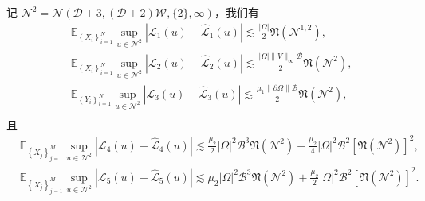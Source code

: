 \begin{lemma}\label{lemma:staerr:Rad234}
记 $\mathcal{N}^{2}=\mathcal{N}(\mathcal{D}+3,(\mathcal{D}+2)\mathcal{W},\{2\},\infty)$，我们有
\begin{equation*}
\begin{aligned}
&\mathbb{E}_{\left\{X_{i}\right\}_{i=1}^{N}} \sup _{u \in \mathcal{N}^{2}}\left|\mathcal{L}_{1}(u)-\widehat{\mathcal{L}}_{1}(u)\right| \lesssim \frac{|\Omega|}{2}\mathfrak{N}\left(\mathcal{N}^{1,2}\right),\\
&\mathbb{E}_{\left\{X_{i}\right\}_{i=1}^{N}} \sup _{u \in \mathcal{N}^{2}}\left|\mathcal{L}_{2}(u)-\widehat{\mathcal{L}}_{2}(u)\right| \lesssim \frac{|\Omega|\|V\|_{\infty}\mathcal{B}}{2}\mathfrak{N}\left(\mathcal{N}^{2}\right),\\
&\mathbb{E}_{\left\{Y_{i}\right\}_{i=1}^{N}} \sup _{u \in \mathcal{N}^{2}}\left|\mathcal{L}_{3}(u)-\widehat{\mathcal{L}}_{3}(u)\right| \lesssim \frac{\mu_{1}\|\partial \Omega\|\mathcal{B}}{2} \mathfrak{N}\left(\mathcal{N}^{2}\right),\\
\end{aligned}
\end{equation*}
且
\begin{equation*}
\begin{aligned}
&\mathbb{E}_{\left\{X_{j}\right\}_{j=1}^{M}} \sup _{u \in \mathcal{N}^{2}}\left|\mathcal{L}_{4}(u)-\widehat{\mathcal{L}}_{4}(u)\right| \lesssim \frac{\mu_{2}}{2}|\Omega|^{2}\mathcal{B}^{3} \mathfrak{N}\left(\mathcal{N}^{2}\right)+\frac{\mu_{2}}{4}|\Omega|^{2}\mathcal{B}^{2}\left[ \mathfrak{N}\left(\mathcal{N}^{2}\right)\right]^{2},\\
&\mathbb{E}_{\left\{X_{j}\right\}_{j=1}^{M}} \sup _{u \in \mathcal{N}^{2}}\left|\mathcal{L}_{5}(u)-\widehat{\mathcal{L}}_{5}(u)\right| \lesssim
\mu_{2}|\Omega|^{2}\mathcal{B}^{3}\mathfrak{N}\left(\mathcal{N}^{2}\right)+\frac{\mu_{2}}{2}|\Omega|^{2}\mathcal{B}^{2}\left[ \mathfrak{N}\left(\mathcal{N}^{2}\right)\right]^{2}.\\
\end{aligned}
\end{equation*}
\end{lemma}
